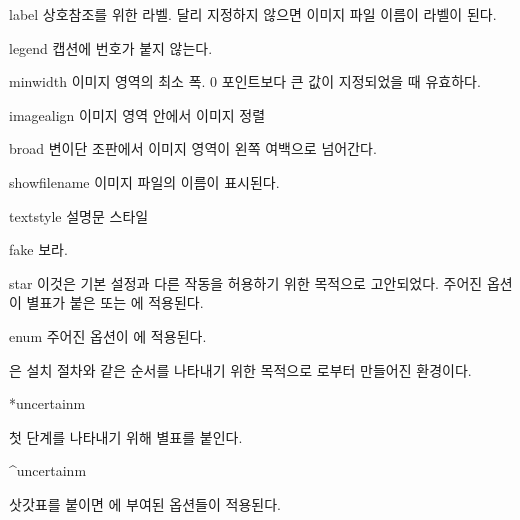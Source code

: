 \documentclass[minted]{hzguide}
\begin{document}
\begin{macros}
\item[label] 
상호참조를 위한 라벨. 달리 지정하지 않으면 이미지 파일 이름이 라벨이 된다.

\item[legend] \keyvalueTF
캡션에 번호가 붙지 않는다.

\item[minwidth] \keyvalue{0pt}
이미지 영역의 최소 폭. 0 포인트보다 큰 값이 지정되었을 때 유효하다.

\item[imagealign] \keyvalue{\raggedright, \centering, \raggedleft}
이미지 영역 안에서 이미지 정렬

\item[broad] \keyvalueTF
변이단 조판에서 이미지 영역이 왼쪽 여백으로 넘어간다.

\item[showfilename]  \keyvalueTF
이미지 파일의 이름이 표시된다.

\item[textstyle] \keyvalue{\raggedright\small}
설명문 스타일 

\item[fake] \keyvalueTF
{}\를 보라.

\item[star] 
이것은 기본 설정과 다른 작동을 허용하기 위한 목적으로 고안되었다.
주어진 옵션이 별표가 붙은 \macro{\illustimage*} 또는 \macro{\begin{IllustImage}*} 에 적용된다. 

\item[enum] 
주어진 옵션이 \macro{\begin{IllustEnum}} 에 적용된다. 
\end{macros}

은 설치 절차와 같은 순서를 나타내기 위한 목적으로 로부터 만들어진 환경이다.

\begin{coderesult}
\begin{IllustEnum}*{uncertainm}
    \item 첫 단계를 나타내기 위해 별표를 붙인다.
\end{IllustEnum}
\begin{IllustEnum}^{uncertainm}
    \item 삿갓표를 붙이면 에 부여된 옵션들이 적용된다.
\end{IllustEnum}
\end{coderesult}
\end{document}
